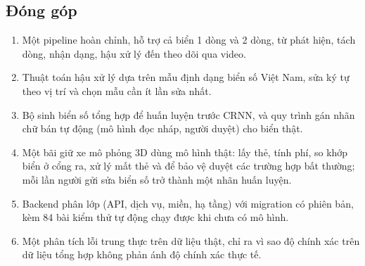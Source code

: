 \subsection{Đóng góp}
\begin{enumerate}[nosep]
  \item Một pipeline hoàn chỉnh, hỗ trợ cả biển 1 dòng và 2 dòng, từ phát hiện, tách dòng, nhận dạng, hậu xử lý đến theo dõi qua video.
  \item Thuật toán hậu xử lý dựa trên mẫu định dạng biển số Việt Nam, sửa ký tự theo vị trí và chọn mẫu cần ít lần sửa nhất.
  \item Bộ sinh biển số tổng hợp để huấn luyện trước CRNN, và quy trình gán nhãn chữ bán tự động (mô hình đọc nháp, người duyệt) cho biển thật.
  \item Một bãi giữ xe mô phỏng 3D dùng mô hình thật: lấy thẻ, tính phí, so khớp biển ở cổng ra, xử lý mất thẻ và để bảo vệ duyệt các trường hợp bất thường; mỗi lần người gửi sửa biển số trở thành một nhãn huấn luyện.
  \item Backend phân lớp (API, dịch vụ, miền, hạ tầng) với migration có phiên bản, kèm 84 bài kiểm thử tự động chạy được khi chưa có mô hình.
  \item Một phân tích lỗi trung thực trên dữ liệu thật, chỉ ra vì sao độ chính xác trên dữ liệu tổng hợp không phản ánh độ chính xác thực tế.
\end{enumerate}
